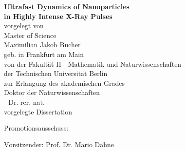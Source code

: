 %
\begin{fullsizetitle}
\vspace{40mm}
\begin{center}
%
{\LARGE \textbf{Ultrafast Dynamics of Nanoparticles\\in Highly Intense X-Ray Pulses\vspace{20mm}\\}}%
{\large%
vorgelegt von
\vspace{4mm}\\
Master of Science}%
\vspace{2mm}\\
%
{\Large Maximilian Jakob Bucher}
\vspace{4mm}\\
%
{\large geb. in Frankfurt am Main} %
\vspace{20mm}
\\
%
{\large %
von der Fakultät II - Mathematik und Naturwissenschaften
\vspace{1mm}\\
der Technischen Universität Berlin
\vspace{1mm}\\
zur Erlangung des akademischen Grades
%
\vspace{5mm}
\\
%
Doktor der Naturwissenschaften
\vspace{1mm}\\
- Dr. rer. nat. -
%
\vspace{10mm}
\\
%
%
vorgelegte Dissertation
\vspace{10mm}}
\\
\end{center}
%
{\large%
\hspace{22mm}Promotionsausschuss:
%
%
\begin{tabbing}
%
\hspace{22mm}\= Vorsitzender:\hspace{20mm} \= Prof. Dr. Mario Dähne \\

\end{tabbing}}
\end{fullsizetitle}
